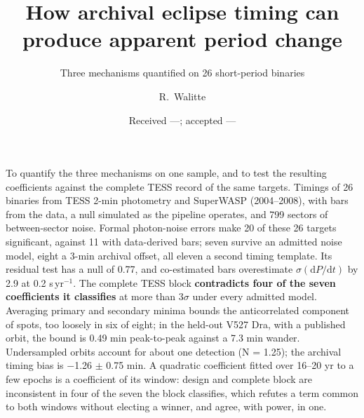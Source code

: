 \documentclass{aa}
\begin{document}
\title{How archival eclipse timing can produce apparent period change}
\subtitle{Three mechanisms quantified on 26 short-period binaries}

\author{R.~Walitte}

\date{Received ---; accepted ---}

{To quantify the three mechanisms on one sample, and to test the resulting coefficients against the complete TESS record of the same targets.}
{Timings of 26 binaries from TESS 2-min photometry and SuperWASP (2004--2008), with bars from the data, a null simulated as the pipeline operates, and 799 sectors of between-sector noise.}
{Formal photon-noise errors make 20 of these 26 targets significant, against 11 with data-derived bars; seven survive an admitted noise model, eight a 3-min archival offset, all eleven a second timing template. Its residual test has a null of 0.77, and co-estimated bars overestimate $\sigma(\mathrm{d}P/\mathrm{d}t)$ by 2.9 at 0.2 s\,yr$^{-1}$. The complete TESS block \textbf{contradicts four of the seven coefficients it classifies} at more than 3$\sigma$ under every admitted model. Averaging primary and secondary minima bounds the anticorrelated component of spots, too loosely in six of eight; in the held-out V527 Dra, with a published orbit, the bound is 0.49 min peak-to-peak against a 7.3 min wander. Undersampled orbits account for about one detection (N = 1.25); the archival timing bias is $-$1.26 $\pm$ 0.75 min.}
{A quadratic coefficient fitted over 16--20 yr to a few epochs is a coefficient of its window: design and complete block are inconsistent in four of the seven the block classifies, which refutes a term common to both windows without electing a winner, and agree, with power, in one.}


\maketitle
\end{document}
